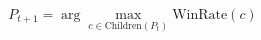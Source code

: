 \documentclass[preview]{standalone}
\begin{document}
\begin{align*}
P_{t+1} = \arg\max_{c \in \text{Children}(P_t)} \text{WinRate}(c)
\end{align*}
\end{document}

